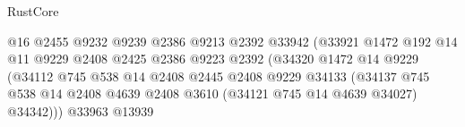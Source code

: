 \begin{lexlean}{RustCore}
\begin{coremodule}
                                                  @16
                                                  @2455
                                                  @9232
                                                  @9239
                                                  @2386
                                                  @9213
                                                  @2392
                                                  @33942
                                                  (@33921
                                                    @1472
                                                    @192
                                                    @14
                                                    @11
                                                    @9229
                                                    @2408
                                                    @2425
                                                    @2386
                                                    @9223
                                                    @2392
                                                    (@34320
                                                      @1472
                                                      @14
                                                      @9229
                                                      (@34112
                                                        @745
                                                        @538
                                                        @14
                                                        @2408
                                                        @2445
                                                        @2408
                                                        @9229
                                                        @34133
                                                        (@34137
                                                          @745
                                                          @538
                                                          @14
                                                          @2408
                                                          @4639
                                                          @2408
                                                          @3610
                                                          (@34121 @745 @14 @4639 @34027)
                                                          @34342)))
                                                    @33963
                                                    @13939

\end{coremodule}
\end{lexlean}
